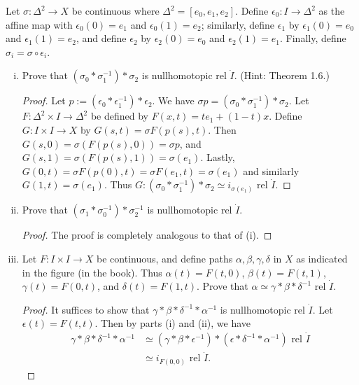 \documentclass{article}
\begin{document}
 Let $\sigma: \Delta^2 \to X$ be continuous where $\Delta^2 = [e_0, e_1, e_2]$.
Define $\epsilon_0 : I \to \Delta^2$ as the affine map with $\epsilon_0(0) = e_1$ and
$\epsilon_0(1) = e_2$; similarly, define $\epsilon_1$ by $\epsilon_1(0) = e_0$ and $\epsilon_1(1) = e_2$,
and define $\epsilon_2$ by $\epsilon_2(0) = e_0$ and $\epsilon_2(1) = e_1$.
Finally, define $\sigma_i = \sigma \circ \epsilon_i$.
\begin{enumerate}[(i)]
\item Prove that $(\sigma_0 * \sigma_1^{-1})  * \sigma_2$ is nullhomotopic rel $\dot I$. (Hint: Theorem 1.6.)
\begin{proof}
Let $p := (\epsilon_0 * \epsilon_1^{-1})  * \epsilon_2$. We have $\sigma  p = (\sigma_0 * \sigma_1^{-1})  * \sigma_2$.
Let $F:\Delta^2 \times I \to \Delta^2$ be defined by $F(x, t) = t e_1 + (1-t)x$.
Define $G: I \times I \to X$ by  $G(s,t) = \sigma F(p(s), t)$. Then $G(s,0) = \sigma(F(p(s),0)) = \sigma p$, and
$G(s,1) = \sigma(F(p(s),1)) = \sigma(e_1)$. Lastly, $G(0,t) = \sigma F(p(0), t) = \sigma F(e_1, t) = \sigma(e_1)$
and similarly $G(1,t) = \sigma(e_1)$.  Thus $G: (\sigma_0 * \sigma_1^{-1})  * \sigma_2 \simeq i_{\sigma(e_1)}$ rel $\dot I$.
\end{proof}
\item Prove that $(\sigma_1 * \sigma_0^{-1}) * \sigma_2^{-1}$ is nullhomotopic rel $\dot I$.
\begin{proof}
The proof is completely analogous to that of (i).
\end{proof}
\item Let $F: I \times I \to X$ be continuous, and define paths $\alpha, \beta, \gamma, \delta$ in $X$ as 
indicated in the figure (in the book). Thus $\alpha(t) = F(t,0)$, $\beta(t) = F(t,1)$, $\gamma(t) = F(0,t)$,
and $\delta(t) = F(1,t)$. Prove that $\alpha \simeq \gamma * \beta * \delta^{-1}$ rel $\dot I$.
\begin{proof}
It suffices to show that $\gamma * \beta * \delta^{-1} * \alpha^{-1} $ is nullhomotopic rel $\dot I$. 
Let $\epsilon(t) = F(t, t)$. Then by parts (i) and (ii), we have
\begin{align*}
\gamma * \beta * \delta^{-1} * \alpha^{-1}  & \simeq (\gamma * \beta * \epsilon^{-1}) * (\epsilon * \delta^{-1} * \alpha^{-1}) \text{ rel } \dot I \\
& \simeq i_{F(0,0)} \text{ rel } \dot I.
\end{align*}
\end{proof}
\end{enumerate}
\end{document}
